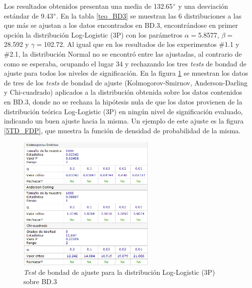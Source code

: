 \documentclass[12pt]{report}
\begin{document}
Los resultados obtenidos presentan una media de 132.65$\degree$ y una desviación estándar de 9.43$\degree$. En la tabla \ref{teo_BD3}  se muestran las 6 distribuciones a las que más se ajustan a los datos encontrados en BD.3, encontrándose en primer opción la distribución Log-Logistic (3P) con los parámetros $\alpha=$5.8577, $\beta=$28.592 y $\gamma=$102.72. Al igual que en los resultados de los experimentos \#1.1 y \#2.1, la distribución Normal no se encontró entre las ajustadas, al contrario de como se esperaba, ocupando el lugar 34 y rechazando los tres \textit{tests} de bondad de ajuste para todos los niveles de significación. En la figura \ref{5TD_BONDAD} se  muestran los datos de tres de los \textit{tests} de bondad de ajuste (Kolmogorov-Smirnov, Anderson-Darling y Chi-cuadrado) aplicados a la distribución obtenida sobre los datos contenidos en BD.3, donde no se rechaza la hipótesis nula de que los datos provienen de la distribución teórica Log-Logistic (3P) en ningún nivel de significación evaluado, indicando un buen ajuste hacia la misma. Un ejemplo de este ajuste es la figura \ref{5TD_FDP}, que muestra la función de densidad de probabilidad de la misma. 
\begin{figure}[ht]
	\centering
	
	\includegraphics[width=0.6\textwidth]{5td_bondad.png}
	\caption{\textit{Test} de bondad de ajuste para la distribución Log-Logistic (3P) sobre BD.3}
	\label{5TD_BONDAD}
\end{figure}
         
\end{document}
